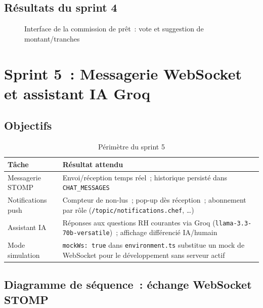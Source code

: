 \subsection{Résultats du sprint 4}

\begin{figure}[H]
  \centering
  \caption{Interface de la commission de prêt~: vote et suggestion de montant/tranches}
  \label{fig:s4_comm}
\end{figure}

\section{Sprint 5~: Messagerie WebSocket et assistant IA Groq}

\subsection{Objectifs}

\begin{table}[H]
\centering
\caption{Périmètre du sprint 5}
\label{tab:s5}
\begin{tabularx}{\textwidth}{|l|L|}
\hline
{}\textbf{Tâche} & \textbf{Résultat attendu} \\\hline
{}
Messagerie STOMP & Envoi/réception temps réel~; historique persisté dans
  \texttt{CHAT\_MESSAGES} \\\hline
Notifications push & Compteur de non-lus~; pop-up dès réception~;
  abonnement par rôle (\texttt{/topic/notifications.chef}, …) \\\hline
{}
Assistant IA & Réponses aux questions RH courantes via Groq
  (\texttt{llama-3.3-70b-versatile})~; affichage différencié IA/humain \\\hline
Mode simulation & \texttt{mockWs: true} dans \texttt{environment.ts}
  substitue un mock de WebSocket pour le développement sans serveur actif \\\hline
\end{tabularx}
\end{table}

\subsection{Diagramme de séquence~: échange WebSocket STOMP}

